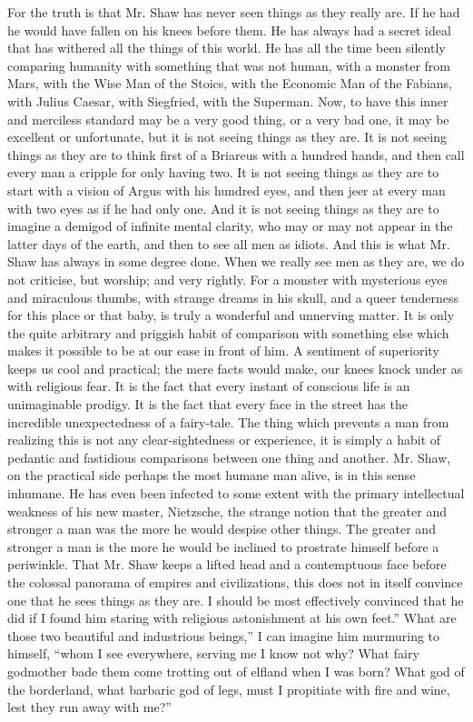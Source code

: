 For the truth is that Mr. Shaw has never seen things as they really are. If he had he would have fallen on his knees before them. He has always had a secret ideal that has withered all the things of this world. He has all the time been silently comparing humanity with something that was not human, with a monster from Mars, with the Wise Man of the Stoics, with the Economic Man of the Fabians, with Julius Caesar, with Siegfried, with the Superman. Now, to have this inner and merciless standard may be a very good thing, or a very bad one, it may be excellent or unfortunate, but it is not seeing things as they are. It is not seeing things as they are to think first of a Briareus with a hundred hands, and then call every man a cripple for only having two. It is not seeing things as they are to start with a vision of Argus with his hundred eyes, and then jeer at every man with two eyes as if he had only one. And it is not seeing things as they are to imagine a demigod of infinite mental clarity, who may or may not appear in the latter days of the earth, and then to see all men as idiots. And this is what Mr. Shaw has always in some degree done. When we really see men as they are, we do not criticise, but worship; and very rightly. For a monster with mysterious eyes and miraculous thumbs, with strange dreams in his skull, and a queer tenderness for this place or that baby, is truly a wonderful and unnerving matter. It is only the quite arbitrary and priggish habit of comparison with something else which makes it possible to be at our ease in front of him. A sentiment of superiority keeps us cool and practical; the mere facts would make, our knees knock under as with religious fear. It is the fact that every instant of conscious life is an unimaginable prodigy. It is the fact that every face in the street has the incredible unexpectedness of a fairy-tale. The thing which prevents a man from realizing this is not any clear-sightedness or experience, it is simply a habit of pedantic and fastidious comparisons between one thing and another. Mr. Shaw, on the practical side perhaps the most humane man alive, is in this sense inhumane. He has even been infected to some extent with the primary intellectual weakness of his new master, Nietzsche, the strange notion that the greater and stronger a man was the more he would despise other things. The greater and stronger a man is the more he would be inclined to prostrate himself before a periwinkle. That Mr. Shaw keeps a lifted head and a contemptuous face before the colossal panorama of empires and civilizations, this does not in itself convince one that he sees things as they are. I should be most effectively convinced that he did if I found him staring with religious astonishment at his own feet.” What are those two beautiful and industrious beings,” I can imagine him murmuring to himself, “whom I see everywhere, serving me I know not why? What fairy godmother bade them come trotting out of elfland when I was born? What god of the borderland, what barbaric god of legs, must I propitiate with fire and wine, lest they run away with me?”


